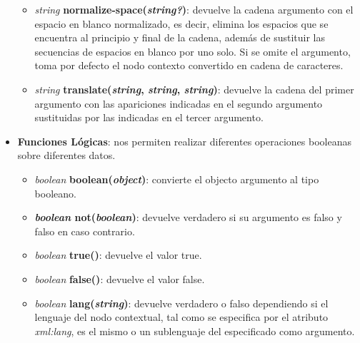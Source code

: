 \begin{itemize}
\begin{itemize}
        \item \textit{string} \textbf{normalize-space(\textit{string?})}: devuelve la cadena argumento con el espacio en blanco normalizado, es decir, elimina los espacios que se encuentra al principio y final de la cadena, además de sustituir las secuencias de espacios en blanco por uno solo. Si se omite el argumento, toma por defecto el nodo contexto convertido en cadena de caracteres.
        \item \textit{string} \textbf{translate(\textit{string}, \textit{string}, \textit{string})}: devuelve la cadena del primer argumento con las apariciones indicadas en el segundo argumento sustituidas por las indicadas en el tercer argumento.
    \end{itemize}

    \item \textbf{Funciones Lógicas}: nos permiten realizar diferentes operaciones booleanas sobre diferentes datos.
    \begin{itemize}
        \item \textit{boolean} \textbf{boolean(\textit{object})}: convierte el objecto argumento al tipo booleano.
        \item \textbf{\textit{boolean} not(\textit{boolean})}: devuelve verdadero si su argumento es falso y falso en caso contrario.
        \item \textit{boolean} \textbf{true()}: devuelve el valor true.
        \item \textit{boolean} \textbf{false()}: devuelve el valor false.
        \item \textit{boolean} \textbf{lang(\textit{string})}: devuelve verdadero o falso dependiendo si el lenguaje del nodo contextual, tal como se especifica por el atributo \textit{xml:lang}, es el mismo o un sublenguaje del especificado como argumento.
    \end{itemize}


\end{itemize}
